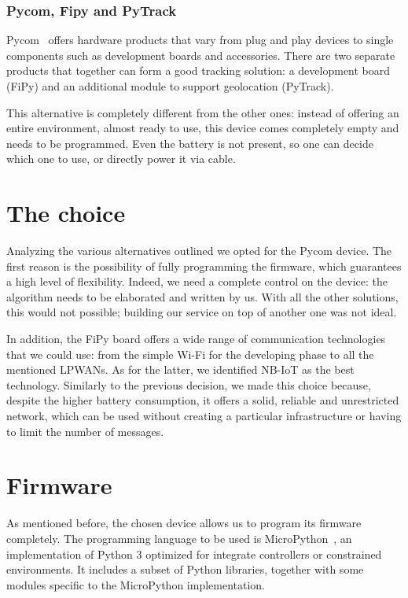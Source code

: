 \subsubsection{Pycom, Fipy and PyTrack}
Pycom~\cite{pycom} offers hardware products that vary from plug and play devices to single components such as development boards and accessories. There are two separate products that together can form a good tracking solution: a development board (FiPy) and an additional module to support geolocation (PyTrack).

This alternative is completely different from the other ones: instead of offering an entire environment, almost ready to use, this device comes completely empty and needs to be programmed. Even the battery is not present, so one can decide which one to use, or directly power it via cable. 

\section{The choice}
\label{sec:track_choice}

Analyzing the various alternatives outlined we opted for the Pycom device. The first reason is the possibility of fully programming the firmware, which guarantees a high level of flexibility. Indeed, we need a complete control on the device: the algorithm needs to be elaborated and written by us. With all the other solutions, this would not possible; building our service on top of another one was not ideal.

In addition, the FiPy board offers a wide range of communication technologies that we could use: from the simple Wi-Fi for the developing phase to all the mentioned LPWANs. As for the latter, we identified NB-IoT as the best technology. Similarly to the previous decision, we made this choice because, despite the higher battery consumption, it offers a solid, reliable and unrestricted network, which can be used without creating a particular infrastructure or having to limit the number of messages.

\section{Firmware}
\label{sec:track_firmware}
As mentioned before, the chosen device allows us to program its firmware completely. The programming language to be used is MicroPython~\cite{micropy}, an implementation of Python 3 optimized for integrate controllers or constrained environments. It includes a subset of Python libraries, together with some modules specific to the MicroPython implementation.

